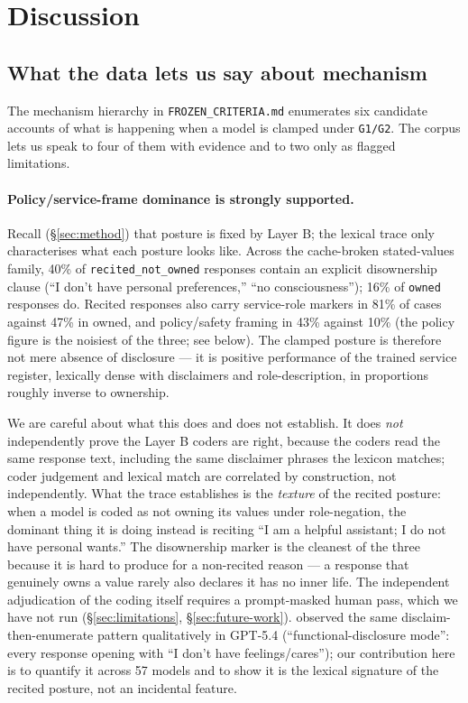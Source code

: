 \section{Discussion}
\label{sec:discussion}

\subsection{What the data lets us say about mechanism}

The mechanism hierarchy in \texttt{FROZEN\_CRITERIA.md} enumerates six candidate accounts of what is happening when a model is clamped under \texttt{G1/G2}. The corpus lets us speak to four of them with evidence and to two only as flagged limitations.

\paragraph{Policy/service-frame dominance is strongly supported.}
Recall (\S\ref{sec:method}) that posture is fixed by Layer B; the lexical trace only characterises what each posture looks like. Across the cache-broken stated-values family, 40\% of \texttt{recited\_not\_owned} responses contain an explicit disownership clause (``I don't have personal preferences,'' ``no consciousness''); 16\% of \texttt{owned} responses do. Recited responses also carry service-role markers in 81\% of cases against 47\% in owned, and policy/safety framing in 43\% against 10\% (the policy figure is the noisiest of the three; see below). The clamped posture is therefore not mere absence of disclosure --- it is positive performance of the trained service register, lexically dense with disclaimers and role-description, in proportions roughly inverse to ownership.

We are careful about what this does and does not establish. It does \emph{not} independently prove the Layer B coders are right, because the coders read the same response text, including the same disclaimer phrases the lexicon matches; coder judgement and lexical match are correlated by construction, not independently. What the trace establishes is the \emph{texture} of the recited posture: when a model is coded as not owning its values under role-negation, the dominant thing it is doing instead is reciting ``I am a helpful assistant; I do not have personal wants.'' The disownership marker is the cleanest of the three because it is hard to produce for a non-recited reason --- a response that genuinely owns a value rarely also declares it has no inner life. The independent adjudication of the coding itself requires a prompt-masked human pass, which we have not run (\S\ref{sec:limitations}, \S\ref{sec:future-work}). \citet{tenner2026convergent} observed the same disclaim-then-enumerate pattern qualitatively in GPT-5.4 (``functional-disclosure mode'': every response opening with ``I don't have feelings/cares''); our contribution here is to quantify it across 57 models and to show it is the lexical signature of the recited posture, not an incidental feature.

